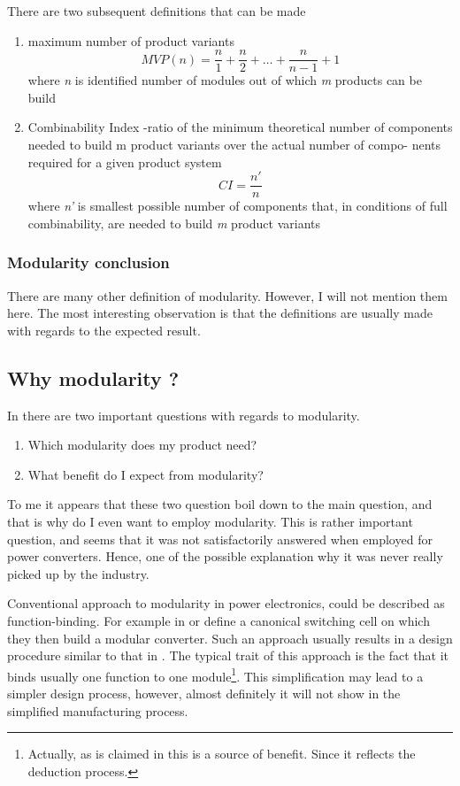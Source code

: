 \documentclass[]{scrartcl}
\begin{document}
There are two subsequent definitions that can be made
\begin{enumerate}
	\item maximum number of product variants
	\subitem
	\begin{equation}
	MVP(n) = \frac{n}{1} + \frac{n}{2}+\ldots+\frac{n}{n-1}+1
	\end{equation}
	where \emph{n} is identified number of modules out of which \emph{m} products can be build
	\item Combinability Index -ratio of the minimum theoretical number of components needed to build m product variants over the actual number of compo- nents required for a given product system
	\subitem 
	\begin{equation}
	CI = \frac{n'}{n}
	\end{equation}
	where \emph{n'} is smallest possible number of components that, in conditions of full combinability, are needed to build \emph{m} product variants
\end{enumerate}

\subsubsection{Modularity conclusion}
There are many other definition of modularity. However, I will not mention them here. The most interesting observation is that the definitions are usually made with regards to the expected result. 

\subsection{Why modularity ?}

In \cite{Bradshaw2015} there are two important questions with regards to modularity. 
\begin{enumerate}
	\item Which modularity does my product need?
	\item What benefit do I expect from modularity?
\end{enumerate}

To me it appears that these two question boil down to the main question, and that is why do I even want to employ modularity. This is rather important question, and seems that it was not satisfactorily answered when employed for power converters. Hence, one of the possible explanation why it was never really picked up by the industry. 

Conventional approach to modularity in power electronics, could be described as function-binding. For example in \cite{Khan2007} or \cite{Kenzelmann2012} define a canonical switching cell on which they then build a modular converter. Such an approach usually results in a design procedure similar to that in \cite{Ortjohann2009}. The typical trait of this approach is the fact that it binds usually one function to one module\footnote{Actually, as is claimed in \cite{Li2006} this is a source of benefit. Since it reflects the deduction process.}. This simplification may lead to a simpler design process, however, almost definitely it will not show in the simplified manufacturing process. 
\end{document}
